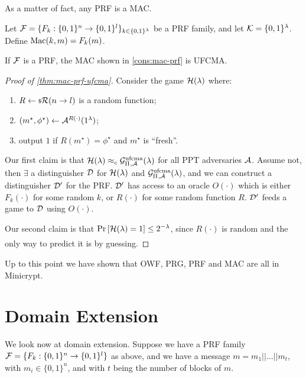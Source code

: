 As a matter of fact, any \ac{PRF} is a \ac{MAC}.

\begin{construction} \label{cons:mac-prf}
	Let $\mathcal{F} = \{ F_k : \{0,1\}^{n} \to \{0,1\}^{l} \}_{k \in \{0,1\}^{\lambda}}$ be a \ac{PRF} family, and let $\mathcal{K} = \{0,1\}^{\lambda}$.
	Define $\mathrm{Mac}(k, m) = F_k(m)$.
\end{construction}

\begin{theorem} \label{thm:mac-prf-ufcma}
	If $\mathcal{F}$ is a \ac{PRF}, the \ac{MAC} shown in \cref{cons:mac-prf} is \ac{UFCMA}.
\end{theorem}

\begin{proof}[Proof of \cref{thm:mac-prf-ufcma}]
	Consider the game $\mathcal{H}(\lambda)$ where:
	\begin{enumerate}
		\item $R \leftarrow {\scriptstyle \$} {\mathcal{R}(n \to l)}$ is a random function;
		\item $(m^{\star}, \phi^{\star}) \leftarrow \mathcal{A}^{R(\cdot)} (1^{\lambda})$;
		\item output $1$ if $R(m^{\star}) = \phi^{\star}$ and $m^{\star}$ is ``fresh''.
	\end{enumerate}
	Our first claim is that $\mathcal{H}(\lambda) \approx_c \mathcal{G}^{\scriptstyle \text{ufcma}}_{\Pi_{},\mathcal{A}}(\lambda)$ for all \ac{PPT} adversaries $\mathcal{A}$.
	Assume not, then $\exists$ a distinguisher $\mathcal{D}$ for $\mathcal{H}(\lambda)$ and $\mathcal{G}^{\scriptstyle \text{ufcma}}_{\Pi_{},\mathcal{A}}(\lambda)$, and we can construct a distinguisher $\mathcal{D}'$ for the \ac{PRF}.
	$\mathcal{D}'$ has access to an oracle $O(\cdot)$ which is either $F_k(\cdot)$ for some random $k$, or $R(\cdot)$ for some random function $R$.
	$\mathcal{D}'$ feeds a game to $\mathcal{D}$ using $O(\cdot)$.

	Our second claim is that $\mathop{\mathrm{Pr}}\limits_{} \left[ {\mathcal{H}(\lambda) = 1} \right] \le 2^{-\lambda}$, since $R(\cdot)$ is random and the only way to predict it is by guessing.
\end{proof}

Up to this point we have shown that \ac{OWF}, \ac{PRG}, \ac{PRF} and \ac{MAC} are all in Minicrypt.

\section{Domain Extension}

We look now at domain extension.
Suppose we have a \ac{PRF} family $\mathcal{F} = \{ F_k : \{0,1\}^{n} \to \{0,1\}^{l}\}$ as above, and we have a message $m = m_1 || \dots || m_t$, with $m_i \in \{0,1\}^{n}$, and with $t$ being the number of blocks of $m$.

